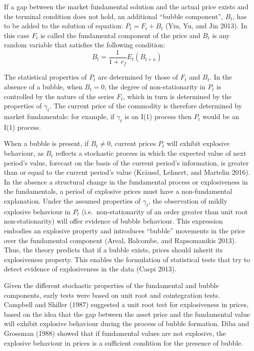 \documentclass[]{elsarticle} %
\begin{document}
If a gap between the market fundamental solution and the actual price
exists and the terminal condition does not hold, an additional ``bubble
component'', \(B_t\), has to be added to the solution of equation:
\(P_t = F_t + B_t\) (Yiu, Yu, and Jin 2013). In this case \(F_t\) is
called the fundamental component of the price and \(B_t\) is any random
variable that satisfies the following condition:
\[B_t = \frac{1}{1+r_f} E_t(B_{t+n})\]

The statistical properties of \(P_t\) are determined by those of \(F_t\)
and \(B_t\). In the absence of a bubble, when \(B_t=0\), the degree of
non-stationarity in \(P_t\) is controlled by the nature of the series
\(F_t\), which in turn is determined by the properties of \(\gamma_t\).
The current price of the commodity is therefore determined by market
fundamentals: for example, if \(\gamma_t\) is an I(1) process then
\(P_t\) would be an I(1) process.

When a bubble is present, if \(B_t \neq 0\), current prices \(P_t\) will
exhibit explosive behaviour, as \(B_t\) reflects a stochastic process in
which the expected value of next period's value, forecast on the basis
of the current period's information, is greater than or equal to the
current period's value (Kräussl, Lehnert, and Martelin 2016). In the
absence a structural change in the fundamental process or explosiveness
in the fundamentals, a period of explosive prices must have a
non-fundamental explanation. Under the assumed properties of
\(\gamma_t\), the observation of mildly explosive behaviour in \(P_t\)
(i.e.~non-stationarity of an order greater than unit root
non-stationarity) will offer evidence of bubble behaviour. This
expression embodies an explosive property and introduces ``bubble''
movements in the price over the fundamental component (Areal, Balcombe,
and Rapsomanikis 2013). Thus, the theory predicts that if a bubble
exists, prices should inherit its explosiveness property. This enables
the formulation of statistical tests that try to detect evidence of
explosiveness in the data (Caspi 2013).

Given the different stochastic properties of the fundamental and bubble
components, early tests were based on unit root and cointegration tests.
Campbell and Shiller (1987) suggested a unit root test for explosiveness
in prices, based on the idea that the gap between the asset price and
the fundamental value will exhibit explosive behaviour during the
process of bubble formation. Diba and Grossman (1988) showed that if
fundamental values are not explosive, the explosive behaviour in prices
is a sufficient condition for the presence of bubble.
\end{document}
